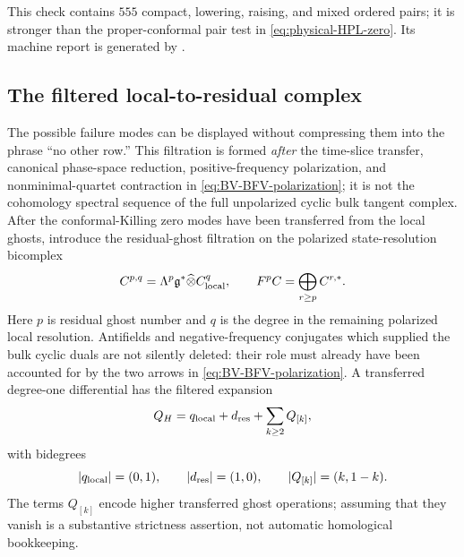 \documentclass[11pt]{article}
\theoremstyle{definition}
\theoremstyle{remark}
\newcommand{\g}{\mathfrak g}
\begin{document}
This check contains $555$ compact, lowering, raising, and mixed ordered
pairs; it is stronger than the proper-conformal pair test in
\eqref{eq:physical-HPL-zero}.  Its machine report is generated by
.

\subsection{The filtered local-to-residual complex}

The possible failure modes can be displayed without compressing them into
the phrase ``no other row.''  This filtration is formed \emph{after} the
time-slice transfer, canonical phase-space reduction, positive-frequency
polarization, and nonminimal-quartet contraction in
\eqref{eq:BV-BFV-polarization}; it is not the cohomology spectral sequence
of the full unpolarized cyclic bulk tangent complex.  After the
conformal-Killing zero modes have been transferred from the local ghosts,
introduce the residual-ghost filtration on the polarized state-resolution
bicomplex
\begin{equation}\label{eq:bicomplex}
 C^{p,q}=\Lambda^p\g^*\widehat\otimes C^q_{\rm local},
 \qquad
 F^pC=\bigoplus_{r\ge p}C^{r,*}.
\end{equation}
Here $p$ is residual ghost number and $q$ is the degree in the remaining
polarized local resolution.  Antifields and negative-frequency conjugates
which supplied the bulk cyclic duals are not silently deleted: their role
must already have been accounted for by the two arrows in
\eqref{eq:BV-BFV-polarization}.  A transferred degree-one differential has
the filtered expansion
\begin{equation}\label{eq:transferred-expansion}
 Q_H=q_{\rm local}+d_{\rm res}
 +\sum_{k\ge2}Q_{[k]},
\end{equation}
with bidegrees
\begin{equation}
 |q_{\rm local}|=(0,1),
 \qquad |d_{\rm res}|=(1,0),
 \qquad |Q_{[k]}|=(k,1-k).
\end{equation}
The terms $Q_{[k]}$ encode higher transferred ghost operations; assuming
that they vanish is a substantive strictness assertion, not automatic
homological bookkeeping.
\end{document}
